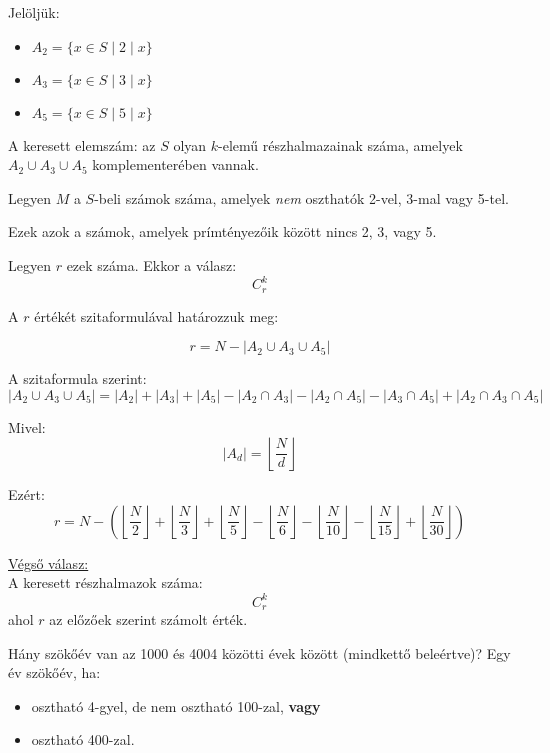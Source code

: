 \begin{solution}
Jelöljük: 
\begin{itemize}
\item $A_{2}=\{x\in S\mid2\mid x\}$ 
\item $A_{3}=\{x\in S\mid3\mid x\}$ 
\item $A_{5}=\{x\in S\mid5\mid x\}$ 
\end{itemize}
A keresett elemszám: az $S$ olyan $k$-elemű részhalmazainak száma,
amelyek $A_{2}\cup A_{3}\cup A_{5}$ komplementerében vannak.

Legyen $M$ a $S$-beli számok száma, amelyek \emph{nem} oszthatók
2-vel, 3-mal vagy 5-tel.

Ezek azok a számok, amelyek prímtényezőik között nincs 2, 3, vagy
5.

Legyen $r$ ezek száma. Ekkor a válasz: 
\[
C_{r}^{k}
\]

A $r$ értékét szitaformulával határozzuk meg:

\[
r=N-|A_{2}\cup A_{3}\cup A_{5}|
\]

A szitaformula szerint: 
\[
|A_{2}\cup A_{3}\cup A_{5}|=|A_{2}|+|A_{3}|+|A_{5}|-|A_{2}\cap A_{3}|-|A_{2}\cap A_{5}|-|A_{3}\cap A_{5}|+|A_{2}\cap A_{3}\cap A_{5}|
\]

Mivel: 
\[
|A_{d}|=\left\lfloor \frac{N}{d}\right\rfloor 
\]

Ezért: 
\[
r=N-\left(\left\lfloor \frac{N}{2}\right\rfloor +\left\lfloor \frac{N}{3}\right\rfloor +\left\lfloor \frac{N}{5}\right\rfloor -\left\lfloor \frac{N}{6}\right\rfloor -\left\lfloor \frac{N}{10}\right\rfloor -\left\lfloor \frac{N}{15}\right\rfloor +\left\lfloor \frac{N}{30}\right\rfloor \right)
\]

\underline{Végső válasz:}\\

A keresett részhalmazok száma: 
\[
\boxed{C_{r}^{k}}
\]
ahol $r$ az előzőek szerint számolt érték. 
\end{solution}
\begin{extraproblem}
 Hány szökőév van az 1000 és 4004 közötti évek között (mindkettő
beleértve)? Egy év szökőév, ha: 
\begin{itemize}
\item osztható 4-gyel, de nem osztható 100-zal, \textbf{vagy} 
\item osztható 400-zal. 
\end{itemize}
\end{extraproblem}

